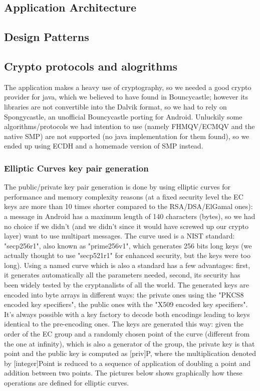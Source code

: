 \documentclass[a4paper,12pt]{article}
\begin{document}
\subsection{Application Architecture}
\subsection{Design Patterns}
\subsection{Crypto protocols and alogrithms}
\small{The application makes a heavy use of cryptography, so we needed a good crypto provider for java, which we believed to have found in Bouncycastle; however its libraries are not convertible into the Dalvik format, so we had to rely on Spongycastle, an unofficial Bouncycastle porting for Android. Unluckily some algorithms/protocols we had intention to use (namely FHMQV/ECMQV and the native SMP) are not supported (no java implementation for them found), so we ended up using ECDH and a homemade version of SMP instead.}
\subsubsection{Elliptic Curves key pair generation}
The public/private key pair generation is done by using elliptic curves for performance and memory complexity reasons (at a fixed security level the EC keys are more than 10 times shorter compared to the RSA/DSA/ElGamal ones): a message in Android has a maximum length of 140 characters (bytes), so we had no choice if we didn't (and we didn't since it would have screwed up our crypto layer) want to use multipart messages. The curve used is a NIST standard: "secp256r1", also known as "prime256v1", which generates 256 bits long keys (we actually thought to use "secp521r1" for enhanced security, but the keys were too long). Using a named curve which is also a standard has a few advantages: first, it generates automatically all the parameters needed, second, its security has been widely tested by the cryptanalists of all the world. The generated keys are encoded into byte arrays in different ways: the private ones using the "PKCS8 encoded key specifiers", the public ones with the "X509 encoded key specifiers". It's always possible with a key factory to decode both encodings leading to keys identical to the pre-encoding ones. The keys are generated this way: given the order of the EC group and a randomly chosen point of the curve (different from the one at infinity), which is also a generator of the group, the private key is that point and the public key is computed as [priv]P, where the multiplication denoted by [integer]Point is reduced to a sequence of application of doubling a point and addition between two points. The pictures below shows graphically how these operations are defined for elliptic curves.\\
\end{document}
